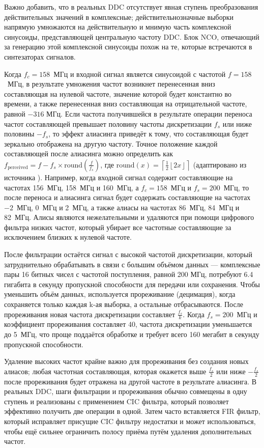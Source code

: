 \documentclass{report}
\begin{document}
Важно добавить, что в реальных DDC отсутствует явная ступень преобразования действительных значений в комплексные; действительнозначные выборки напрямую умножаются на действительную и мнимую часть комплексной синусоиды, представляющей центральную частоту DDC. Блок NCO, отвечающий за генерацию этой комплексной синусоиды похож на те, которые встречаются в синтезаторах сигналов.

Когда $f_c=158$~МГц и входной сигнал является синусоидой с частотой $f=158$~МГц, в результате умножения частот возникнет перенесенная вниз составляющая на нулевой частоте, значение которой будет константно во времени, а также перенесенная вниз составляющая на отрицательной частоте, равной $-316$ МГц. Если частота получившейся в результате операции переноса частот составляющей превышает половину частоты дискретизации $f_s$ или ниже половины $-f_s$, то эффект алиасинга приведёт к тому, что составляющая будет зеркально отображена на другую частоту. Точное положение каждой составляющей после алиасинга можно определить как $f_\text{perceived}=f - f_s \times \text{round}(\frac{f}{f_s})$, где $\text{round}(x)=\left\lceil \frac{1}{2} \left\lfloor 2x \right\rfloor \right\rceil$ (адаптировано из источника \cite{aliasing}). Например, когда входной сигнал содержит составляющие на частотах 156~МГц, 158~МГц и 160~МГц, а $f_c=158$~МГц и $f_s=200$~МГц, то после переноса и алиасинга сигнал будет содержать составляющие на частотах $-2$~МГц, 0~МГц и 2~МГц, а также алиасы на частотах 86~МГц, 84~МГц и 82~МГц. Алисы являются нежелательными и удаляются при помощи цифрового фильтра низких частот, который убирает все частотные составляющие за исключением близких к нулевой частоте.

После фильтрации остаётся сигнал с высокой частотой дискретизации, который затруднительно обрабатывать в связи с большим объёмом данных --- комплексные пары 16 битных чисел с частотой поступления, равной 200 МГц, потребуют 6.4 гигабита в секунду пропускной способности для передачи или сохранения. Чтобы уменьшить объём данных, используется прореживание (децимация), когда сохраняется только каждая k-ая выборка, а остальные отбрасываются. После прореживания новая частота дискретизации составляет $\frac{f_s}{k}$. Когда $f_s=200$~МГц и коэффициент прореживания составляет 40, частота дискретизации уменьшается до 5~МГц, что проще поддаётся обработке и требует всего 160 мегабит в секунду пропускной способности.

Удаление высоких частот крайне важно для прореживания без создания новых алиасов; любая частотная составляющая, которая окажется выше $\frac{f_s}{2}$ или ниже $-\frac{f_s}{2}$ после прореживания будет отражена на другой частоте в результате алиасинга. В реальных DDC, шаги фильтрации и прореживания обычно совмещены в одну ступень и реализованы с применением CIC фильтра, который позволяет эффективно получить две операции в одной. Затем часто вставляется FIR фильтр, который исправляет присущие CIC фильтру недостатки и может использоваться, чтобы ещё сильнее ограничить полосу приёма путём удаления дополнительных частот.
\end{document}
